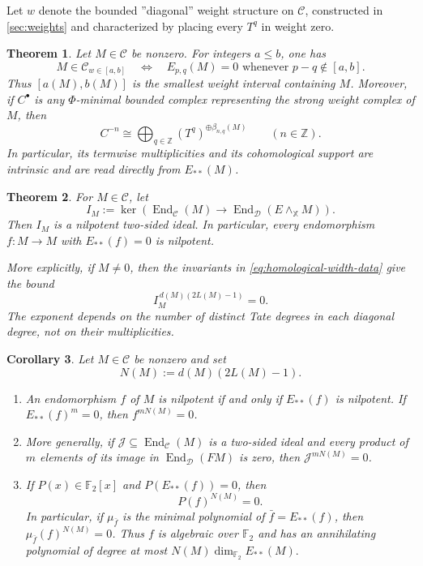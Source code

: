 \documentclass[11pt]{amsart}
\numberwithin{equation}{section}
\newtheorem{theorem}{Theorem}[section]
\newtheorem{corollary}[theorem]{Corollary}
\theoremstyle{definition}
\theoremstyle{remark}
\DeclareMathOperator{\End}{End}
\newcommand{\F}{\mathbb F_2}
\newcommand{\X}{\mathbb X}
\newcommand{\C}{\mathcal C}
\newcommand{\D}{\mathcal D}
\begin{document}

Let $w$ denote the bounded ''diagonal'' weight structure on $\C$, constructed in
\cref{sec:weights} and characterized by placing every $T^q$ in weight zero.

\begin{theorem}\label{thm:weight-profile}
Let $M\in\C$ be nonzero.  For integers $a\le b$, one has
\[
  M\in\C_{w\in[a,b]}
  \quad\Longleftrightarrow\quad
  E_{p,q}(M)=0\text{ whenever }p-q\notin[a,b].
\]
Thus $[a(M),b(M)]$ is the smallest weight interval containing $M$.
Moreover, if $C^\bullet$ is any $\Phi$-minimal bounded complex representing
the strong weight complex of $M$, then
\[
  C^{-n}\cong
  \bigoplus_{q\in\mathbb Z}(T^q)^{\oplus\beta_{n,q}(M)}
  \qquad(n\in\mathbb Z).
\]
In particular, its termwise multiplicities and its cohomological support are
intrinsic and are read directly from $E_{**}(M)$.
\end{theorem}

\begin{theorem}
\label{thm:nilpotence}
For $M\in\C$, let
\[
  I_M:=\ker\!\left(
  \End_{\C}(M)\longrightarrow
  \End_{\D}(E\wedge_{\X}M)
  \right).
\]
Then $I_M$ is a nilpotent two-sided ideal.  In particular, every 
endomorphism $f\colon M\to M$ with $E_{**}(f)=0$ is nilpotent.

More explicitly, if $M\ne0$, then the invariants in
\eqref{eq:homological-width-data} give the  bound
\[
  I_M^{\,d(M)(2L(M)-1)}=0.
\]
The exponent depends on the number of \emph{distinct} Tate degrees in each
diagonal degree, not on their multiplicities.  
\end{theorem}

\begin{corollary}
\label{cor:nilpotence-detection}
Let $M\in\C$ be nonzero and set
\[
  N(M):=d(M)(2L(M)-1).
\]
\begin{enumerate}[label=\textup{(\roman*)}]
\item An endomorphism $f$ of $M$ is nilpotent if and only if
$E_{**}(f)$ is nilpotent.  If $E_{**}(f)^m=0$, then $f^{mN(M)}=0$.
\item More generally, if $\mathcal J\subseteq\End_{\C}(M)$ is a two-sided
ideal and every product of $m$ elements of its image in
$\End_{\D}(FM)$ is zero, then $\mathcal J^{mN(M)}=0$.
\item If $P(x)\in\F[x]$ and $P(E_{**}(f))=0$, then
\[
  P(f)^{N(M)}=0.
\]
In particular, if $\mu_{\bar f}$ is the minimal polynomial of
$\bar f=E_{**}(f)$, then $\mu_{\bar f}(f)^{N(M)}=0$.  Thus $f$ is algebraic
over $\F$ and has an annihilating polynomial of degree at most
\(N(M)\dim_{\F}E_{**}(M).
\)
\end{enumerate}
\end{corollary}
\end{document}
